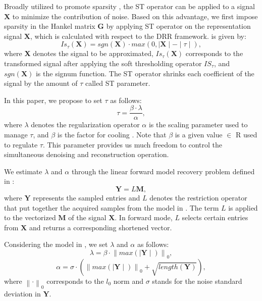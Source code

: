 Broadly utilized to promote sparsity \citep{donoho1995noising,figueiredo2003algorithm,daubechies2004iterative}, the ST operator can be applied to a signal $\mathbf{X}$  to minimize the contribution of noise. Based on this advantage, we first impose sparsity in the Hankel matrix $\mathbf{G}$ by applying   ST operator on the representation signal $\textbf{X}$, which is calculated with respect to the DRR framework.  \citep{donoho1995noising,candes2010matrix,yeganli2017noise} is given by:  
\begin{equation}
Is_\tau\left(\mathbf{X}\right)=sgn(\mathbf{X})\cdot max(0,{\mid \mathbf{X} \mid - \mid \tau \mid}),
\end{equation}
where \textbf{X} denotes the signal to be approximated, $Is_\tau\left(\mathbf{X}\right)$ corresponds to the transformed signal after applying the soft thresholding operator $IS_\tau$, and $sgn( \textbf{X})$ is the signum function. The ST operator shrinks each coefficient of the signal by the amount of $\tau$ called ST parameter. 

In this paper, we propose to set $\tau$ as follows:
\begin{equation}
\tau=\frac{\beta \cdot \lambda}{\alpha},
\end{equation}
where $\lambda$ denotes the regularization operator $\alpha$ is the scaling parameter used to manage $\tau$, and $\beta$ is the  factor for cooling \wen{$\lambda$}. Note that $\beta$ is a given value $\in$ R used to regulate $\tau$. This parameter provides us much freedom to control the simultaneous denoising and reconstruction operation.

We estimate $\lambda$ and $\alpha$ through the linear forward model  recovery problem defined in \cite{hennenfent2008sampling}:
\begin{equation}
\mathbf{Y}=L\mathbf{M},
\end{equation}
where $\mathbf{Y}$ represents the sampled entries and ${L}$ denotes the restriction operator that put together the acquired samples from the model in . The term ${L}$ is applied to the vectorized $\textbf{M}$ of the signal $\mathbf{X}$. In forward mode, ${L}$ selects certain entries from $\mathbf{X}$ and returns a corresponding shortened vector. 

Considering the model in , we set $\lambda$ and $\alpha$ as follows:
\begin{equation}
\lambda=\beta \cdot \left\| max\left(\mid \mathbf{Y} \mid \right) \right\|_0, 
\end{equation}
\begin{equation}
\alpha=\sigma \cdot \left(\left\| max\left(\mid \mathbf{Y} \mid \right) \right\|_0 + \sqrt{length(\mathbf{Y})} \right),
\end{equation}
where $\left\|\cdot\right\|_0$ corresponds to the $l_0$ norm and $\sigma$ stands for the noise standard deviation in $\mathbf{Y}$.\\ 

